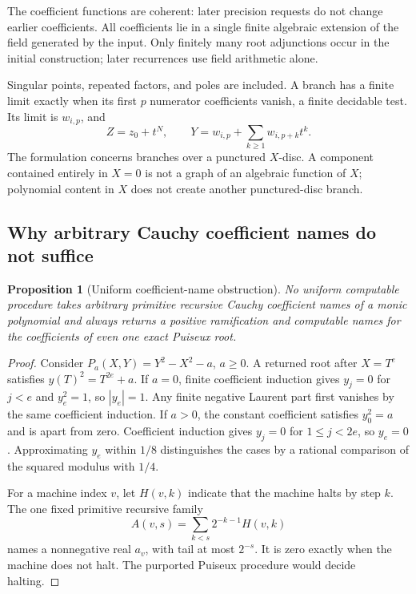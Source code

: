 \documentclass[11pt]{article}
\newtheorem{proposition}[theorem]{Proposition}
\theoremstyle{definition}
\begin{document}
The coefficient functions are coherent: later precision requests do not
change earlier coefficients. All coefficients lie in a single finite
algebraic extension of the field generated by the input. Only finitely many
root adjunctions occur in the initial construction; later recurrences use
field arithmetic alone.

Singular points, repeated factors, and poles are included. A branch has a
finite limit exactly when its first \(p\) numerator coefficients vanish,
a finite decidable test. Its limit is \(w_{i,p}\), and
\[
 Z=z_0+t^N,\qquad Y=w_{i,p}+\sum_{k\ge1}w_{i,p+k}t^k.
\]
The formulation concerns branches over a punctured \(X\)-disc. A component
contained entirely in \(X=0\) is not a graph of an algebraic function of \(X\);
polynomial content in \(X\) does not create another punctured-disc branch.

\subsection{Why arbitrary Cauchy coefficient names do not suffice}
\label{subsec:obstruction}
\begin{proposition}[Uniform coefficient-name obstruction]
\label{prop:obstruction}
No uniform computable procedure takes arbitrary primitive recursive Cauchy
coefficient names of a monic polynomial and always returns a positive
ramification and computable names for the coefficients of even one exact
Puiseux root.
\end{proposition}
\begin{proof}
Consider \(P_a(X,Y)=Y^2-X^2-a\), \(a\ge0\). A returned root after \(X=T^e\)
satisfies \(y(T)^2=T^{2e}+a\).
If \(a=0\), finite coefficient induction gives \(y_j=0\) for \(j<e\) and
\(y_e^2=1\), so \(|y_e|=1\). Any finite negative Laurent part first vanishes
by the same coefficient induction.
If \(a>0\), the constant coefficient satisfies \(y_0^2=a\) and is apart
from zero. Coefficient induction gives \(y_j=0\) for \(1\le j<2e\), so
\(y_e=0\).
Approximating \(y_e\) within \(1/8\) distinguishes the cases by a rational
comparison of the squared modulus with \(1/4\).

For a machine index \(v\), let \(H(v,k)\) indicate that the machine halts
by step \(k\). The one fixed primitive recursive family
\[
 A(v,s)=\sum_{k<s}2^{-k-1}H(v,k)
\]
names a nonnegative real \(a_v\), with tail at most \(2^{-s}\).
It is zero exactly when the machine does not halt. The purported Puiseux
procedure would decide halting.
\end{proof}
\end{document}
